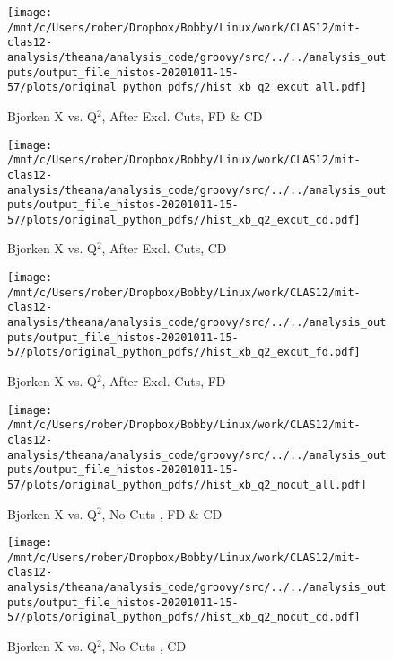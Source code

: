 \documentclass{article}
\begin{document}
\begin{landscape}
    \begin{figure}[h]
        \centering

        \texttt{[image: /mnt/c/Users/rober/Dropbox/Bobby/Linux/work/CLAS12/mit-clas12-analysis/theana/analysis\_code/groovy/src/../../analysis\_outputs/output\_file\_histos-20201011-15-57/plots/original\_python\_pdfs//hist\_xb\_q2\_excut\_all.pdf]}
        \captionsetup{textformat=empty,labelformat=blank}
        \caption{Bjorken X vs. Q$^{2}$, After Excl. Cuts, FD \& CD}
    \end{figure}
    \clearpage
    
    \begin{figure}[h]
        \centering

        \texttt{[image: /mnt/c/Users/rober/Dropbox/Bobby/Linux/work/CLAS12/mit-clas12-analysis/theana/analysis\_code/groovy/src/../../analysis\_outputs/output\_file\_histos-20201011-15-57/plots/original\_python\_pdfs//hist\_xb\_q2\_excut\_cd.pdf]}
        \captionsetup{textformat=empty,labelformat=blank}
        \caption{Bjorken X vs. Q$^{2}$, After Excl. Cuts, CD}
    \end{figure}
    \clearpage
    
    \begin{figure}[h]
        \centering

        \texttt{[image: /mnt/c/Users/rober/Dropbox/Bobby/Linux/work/CLAS12/mit-clas12-analysis/theana/analysis\_code/groovy/src/../../analysis\_outputs/output\_file\_histos-20201011-15-57/plots/original\_python\_pdfs//hist\_xb\_q2\_excut\_fd.pdf]}
        \captionsetup{textformat=empty,labelformat=blank}
        \caption{Bjorken X vs. Q$^{2}$, After Excl. Cuts, FD}
    \end{figure}
    \clearpage
    
    \begin{figure}[h]
        \centering

        \texttt{[image: /mnt/c/Users/rober/Dropbox/Bobby/Linux/work/CLAS12/mit-clas12-analysis/theana/analysis\_code/groovy/src/../../analysis\_outputs/output\_file\_histos-20201011-15-57/plots/original\_python\_pdfs//hist\_xb\_q2\_nocut\_all.pdf]}
        \captionsetup{textformat=empty,labelformat=blank}
        \caption{Bjorken X vs. Q$^{2}$, No Cuts , FD \& CD}
    \end{figure}
    \clearpage
    
    \begin{figure}[h]
        \centering

        \texttt{[image: /mnt/c/Users/rober/Dropbox/Bobby/Linux/work/CLAS12/mit-clas12-analysis/theana/analysis\_code/groovy/src/../../analysis\_outputs/output\_file\_histos-20201011-15-57/plots/original\_python\_pdfs//hist\_xb\_q2\_nocut\_cd.pdf]}
        \captionsetup{textformat=empty,labelformat=blank}
        \caption{Bjorken X vs. Q$^{2}$, No Cuts , CD}
    \end{figure}
    \clearpage
    

\end{landscape}
\end{document}
